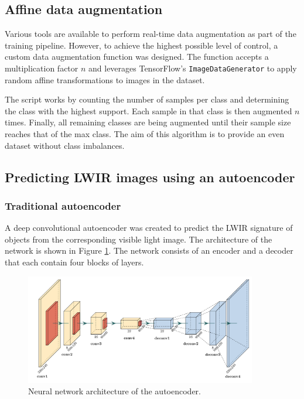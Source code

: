 \documentclass{l4proj}
\begin{document}
\subsection{Affine data augmentation}
\label{augmentation_impl}

Various tools are available to perform real-time data augmentation as part of the training pipeline. However, to achieve the highest possible level of control, a custom data augmentation function was designed. The function accepts a multiplication factor $n$ and leverages TensorFlow's \lstinline{ImageDataGenerator} to apply random affine transformations to images in the dataset.

The script works by counting the number of samples per class and determining the class with the highest support. Each sample in that class is then augmented $n$ times. Finally, all remaining classes are being augmented until their sample size reaches that of the max class. The aim of this algorithm is to provide an even dataset without class imbalances.


\subsection{Predicting LWIR images using an autoencoder}
\label{autoencoder_implementation}

\subsubsection{Traditional autoencoder}

A deep convolutional autoencoder was created to predict the LWIR signature of objects from the corresponding visible light image. The architecture of the network is shown in Figure \ref{fig:autoencoder_architecture}. The network consists of an encoder and a decoder that each contain four blocks of layers.

\begin{figure}[ht]
  \centering
  \includegraphics[width=0.9\textwidth]{images/models/autoencoder}
  \caption{Neural network architecture of the autoencoder.}
  \label{fig:autoencoder_architecture}
\end{figure}
\end{document}
